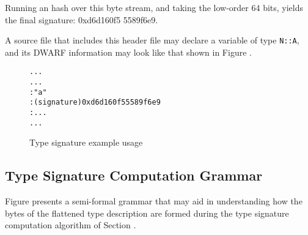 Running an \MDfive{} hash over this byte stream, and taking the
low-order 64 bits, yields the final signature: 0xd6d160f5
5589f6e9.

A source file that includes this header file may declare a
variable of type \texttt{N::A}, and its DWARF information may look
like that shown in 
Figure .

\begin{figure}[h]
\begin{dwflisting}
\begin{alltt}
  \DWTAGcompileunit
  ...
  \DWTAGsubprogram
    ...
    \DWTAGvariable
      \DWATname : "a"
      \DWATtype : (signature) 0xd6d160f5 5589f6e9
      \DWATlocation : ...
    ...
\end{alltt}
\end{dwflisting}
\caption{Type signature example usage}
\label{fig:typesignatureexampleusage}
\end{figure}

\subsection{Type Signature Computation Grammar}
\label{app:typesignaturecomputationgrammar}

Figure 
presents a semi-formal grammar that may aid in understanding
how the bytes of the flattened type description are formed
during the type signature computation algorithm of
Section . 


